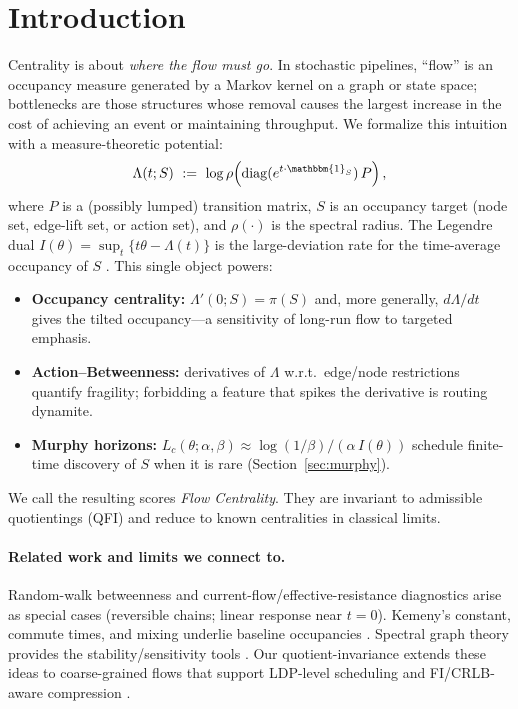 \documentclass[11pt]{article}
\newcommand{\1}{\mathbbm{1}}
\begin{document}
\section{Introduction}\label{sec:intro}
Centrality is about \emph{where the flow must go}. In stochastic pipelines, “flow” is an occupancy measure generated by a Markov kernel on a graph or state space; bottlenecks are those structures whose removal causes the largest increase in the cost of achieving an event or maintaining throughput. We formalize this intuition with a measure-theoretic potential:
\[
\Lambda(t;S)\ :=\ \log \rho\!\left(\mathrm{diag}(e^{t\cdot \1_S})\,P\right),
\]
where $P$ is a (possibly lumped) transition matrix, $S$ is an occupancy target (node set, edge-lift set, or action set), and $\rho(\cdot)$ is the spectral radius. The Legendre dual $I(\theta)=\sup_{t}\{t\theta-\Lambda(t)\}$ is the large-deviation rate for the time-average occupancy of $S$ \parencite{DemboZeitouni1998}. This single object powers:
\begin{itemize}[leftmargin=1.25em]
\item \textbf{Occupancy centrality:} $\Lambda'(0;S)=\pi(S)$ and, more generally, $d\Lambda/dt$ gives the tilted occupancy---a sensitivity of long-run flow to targeted emphasis.
\item \textbf{Action--Betweenness:} derivatives of $\Lambda$ w.r.t.\ edge/node restrictions quantify fragility; forbidding a feature that spikes the derivative is routing dynamite.
\item \textbf{Murphy horizons:} $L_c(\theta;\alpha,\beta)\approx \log(1/\beta)/(\alpha\,I(\theta))$ schedule finite-time discovery of $S$ when it is rare (Section~\ref{sec:murphy}).
\end{itemize}
We call the resulting scores \emph{Flow Centrality}. They are invariant to admissible quotientings (QFI) and reduce to known centralities in classical limits.

\paragraph{Related work and limits we connect to.}
Random-walk betweenness \parencite{Newman2005} and current-flow/effective-resistance diagnostics \parencite{DoyleSnell1984} arise as special cases (reversible chains; linear response near $t=0$). Kemeny’s constant, commute times, and mixing underlie baseline occupancies \parencite{KemenySnell1976,LevinPeresWilmer2009}. Spectral graph theory provides the stability/sensitivity tools \parencite{Chung1997}. Our quotient-invariance extends these ideas to coarse-grained flows that support LDP-level scheduling and FI/CRLB-aware compression \parencite{elliott2025qfi,Blackwell1953,AmariNagaoka2000,Cencov1982}.
\end{document}
